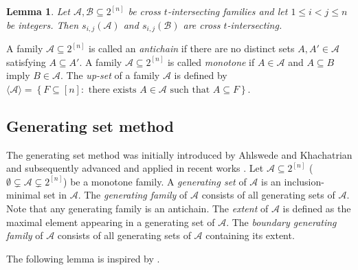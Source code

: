 \documentclass[11pt,a4paper]{article}
\newtheorem{lemma}[theorem]{Lemma}
\begin{document}
\begin{lemma} \label{G23}
 Let $\mathcal{A},\mathcal{B}  \subseteq 2^{[n]}$  be  cross $t$-intersecting families and let $1 \leq i<j \leq n$ be integers.
Then $s_{i, j}(\mathcal{A})$ and $s_{i, j}(\mathcal{B})$ are cross $t$-intersecting.
\end{lemma}



A family $\mathcal{A}\subseteq 2^{[n]}$ is called an \textit{antichain} if there are no distinct sets $A, A'\in\mathcal{A}$ satisfying $A\subseteq A'$.
A family $\mathcal{A}\subseteq 2^{[n]}$ is called \textit{monotone} if $A\in\mathcal{A}$ and $A\subseteq B$ imply $B\in\mathcal{A}$. 
The \textit{up-set} of a family $\mathcal{A}$ is defined by
$
\langle\mathcal{A}\rangle=\left\{F\subseteq [n]: \text{ there exists }A \in\mathcal{A}\text{ such that }A\subseteq F\right\}.
$


\subsection{Generating set method}


The generating set method was initially introduced by  Ahlswede and Khachatrian \cite{AK1996, AK1997} and subsequently advanced and applied in recent works \cite{Fil2017, L25,ZW2025}.
Let $\mathcal{A}\subseteq 2^{[n]}$ ($\emptyset\subsetneq\mathcal{A}\subsetneq 2^{[n]}$) be a monotone family. A \textit{generating set} of $\mathcal{A}$ is an inclusion-minimal   set  in $\mathcal{A}$. 
The \textit{generating family} of $\mathcal{A}$ consists of all generating sets of $\mathcal{A}$. Note that any generating family is an antichain.
 The \textit{extent} of $\mathcal{A}$ is defined as the maximal element appearing in a generating set of $\mathcal{A}$. The \textit{boundary generating family} of $\mathcal{A}$ consists of all generating sets of $\mathcal{A}$ containing its extent.

The following lemma is inspired by  \cite[Lemma 2.2]{F24}.
\end{document}
